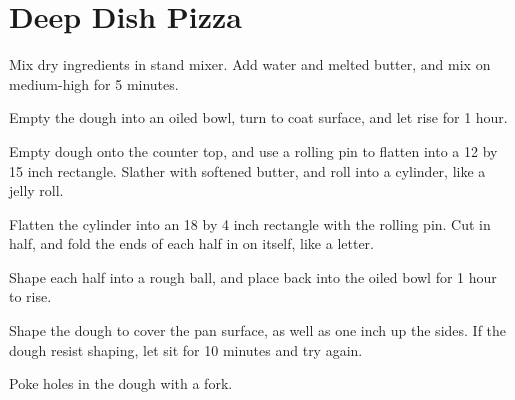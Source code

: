 

\section{Deep Dish Pizza}
\begin{recipe}



Mix dry ingredients in stand mixer. Add water and melted butter, and mix on medium-high for 5 minutes.

Empty the dough into an oiled bowl, turn to coat surface, and let rise for 1 hour.

Empty dough onto the counter top, and use a rolling pin to flatten into a 12 by 15 inch rectangle. Slather with softened butter, and roll into a cylinder, like a jelly roll.

Flatten the cylinder into an 18 by 4 inch rectangle with the rolling pin. Cut in half, and fold the ends of each half in on itself, like a letter.

Shape each half into a rough ball, and place back into the oiled bowl for 1 hour to rise.

Shape the dough to cover the pan surface, as well as one inch up the sides. If the dough resist shaping, let sit for 10 minutes and try again.

Poke holes in the dough with a fork.



\end{recipe}
